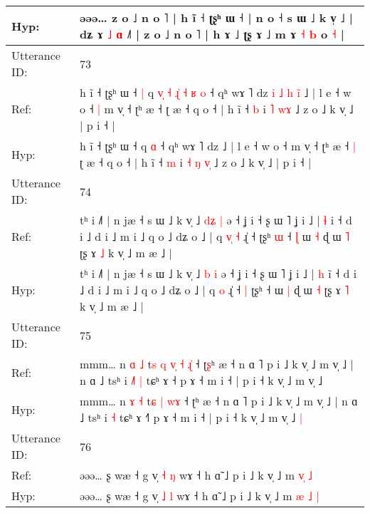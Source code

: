 \documentclass[10pt]{article}
\DeclareRobustCommand{\hl}[1]{{\textcolor{red}{#1}}}
\begin{document}
\begin{longtable}{ll}
 \\
Hyp: & əəə… z o ˩ n o ˥ | h ĩ ˧ ʈʂʰ ɯ ˧ | n o ˧ s ɯ ˩ k v̩ ˩ | dʑ ɤ\hl{ }\hl{˩}\hl{ }\hl{ɑ} ˩˥ | z o ˩ n o ˥ | h ɤ ˩ ʈʂ ɤ ˩ m ɤ \hl{˧} \hl{b} o \hl{}\hl{˧} |
 \\
\midrule
Utterance ID: & 73 \\
Ref: & h ĩ ˧ ʈʂʰ ɯ ˧\hl{ }\hl{|} q\hl{ }\hl{v}\hl{̩}\hl{ }\hl{˧}\hl{ }\hl{ɻ}\hl{̍}\hl{ }\hl{˧}\hl{ }\hl{ʁ} \hl{o} ˧ qʰ wɤ ˥ dz\hl{ }\hl{i}\hl{ }\hl{˩}\hl{ }\hl{h}\hl{ }\hl{i}\hl{̃} ˩ | l e ˧ w o ˧\hl{ }\hl{|} m v̩ ˧ ʈʰ æ ˧\hl{}\hl{} ʈ æ ˧ q o ˧ | h ĩ ˧ \hl{b} i\hl{}\hl{} \hl{˥} \hl{w}\hl{ɤ} ˩ z o ˩ k v̩ ˩ | p i ˧ |
 \\
Hyp: & h ĩ ˧ ʈʂʰ ɯ ˧\hl{}\hl{} q\hl{}\hl{}\hl{}\hl{}\hl{}\hl{}\hl{}\hl{}\hl{}\hl{}\hl{}\hl{} \hl{ɑ} ˧ qʰ wɤ ˥ dz\hl{}\hl{}\hl{}\hl{}\hl{}\hl{}\hl{}\hl{}\hl{} ˩ | l e ˧ w o ˧\hl{}\hl{} m v̩ ˧ ʈʰ æ ˧\hl{ }\hl{|} ʈ æ ˧ q o ˧ | h ĩ ˧ \hl{m} i\hl{ }\hl{˧} \hl{ŋ} \hl{v}\hl{̩} ˩ z o ˩ k v̩ ˩ | p i ˧ |
 \\
\midrule
Utterance ID: & 74 \\
Ref: & tʰ i ˩˥ | n jæ ˧ s ɯ ˩ k v̩ ˩ \hl{d}\hl{ʑ} \hl{|} ə ˧ ʝ i ˧ ʂ ɯ ˥ ʝ i ˩ | \hl{ɬ} i\hl{} ˧ d i ˩ d i ˩ m i ˩ q o ˩ dʑ o ˩ | q\hl{ }\hl{v}\hl{̩} \hl{˧} ɻ̍ ˧\hl{}\hl{} ʈʂʰ\hl{ }\hl{ɯ} ˧\hl{ }\hl{ɭ} ɯ \hl{˧} ɖ ɯ \hl{˥} ʈʂ ɤ \hl{˩} k v̩ ˩ m æ ˩ |
 \\
Hyp: & tʰ i ˩˥ | n jæ ˧ s ɯ ˩ k v̩ ˩ \hl{}\hl{b} \hl{i} ə ˧ ʝ i ˧ ʂ ɯ ˥ ʝ i ˩ | \hl{h} i\hl{̃} ˧ d i ˩ d i ˩ m i ˩ q o ˩ dʑ o ˩ | q\hl{}\hl{}\hl{} \hl{o} ɻ̍ ˧\hl{ }\hl{|} ʈʂʰ\hl{}\hl{} ˧\hl{}\hl{} ɯ \hl{|} ɖ ɯ \hl{˧} ʈʂ ɤ \hl{˥} k v̩ ˩ m æ ˩ |
 \\
\midrule
Utterance ID: & 75 \\
Ref: & mmm… n \hl{ɑ} \hl{˩} t\hl{s}\hl{ }\hl{q}\hl{ }\hl{v}\hl{̩} \hl{˧} \hl{ɻ}\hl{̍} ˧ ʈ\hl{ʂ}ʰ æ ˧ n ɑ ˥ p i ˩ k v̩ ˩ m v̩ ˩ | n ɑ ˩ tsʰ i\hl{ }\hl{˩}\hl{˥} \hl{|} tɕʰ ɤ ˧\hl{} p ɤ ˧ m i ˧ | p i ˧ k v̩ ˩ m v̩ ˩\hl{}\hl{}
 \\
Hyp: & mmm… n \hl{ɤ} \hl{˧} t\hl{}\hl{}\hl{}\hl{}\hl{}\hl{ɕ} \hl{|} \hl{w}\hl{ɤ} ˧ ʈ\hl{}ʰ æ ˧ n ɑ ˥ p i ˩ k v̩ ˩ m v̩ ˩ | n ɑ ˩ tsʰ i\hl{}\hl{}\hl{} \hl{˧} tɕʰ ɤ ˧\hl{˥} p ɤ ˧ m i ˧ | p i ˧ k v̩ ˩ m v̩ ˩\hl{ }\hl{|}
 \\
\midrule
Utterance ID: & 76 \\
Ref: & əəə… ʂ wæ ˧ g v̩ \hl{˧} \hl{ŋ} wɤ ˧ h ɑ̃ ˩ p i ˩ k v̩ ˩ m \hl{}\hl{v}\hl{̩} \hl{˩}
 \\
Hyp: & əəə… ʂ wæ ˧ g v̩ \hl{˩} \hl{l} wɤ ˧ h ɑ̃ ˩ p i ˩ k v̩ ˩ m \hl{æ}\hl{ }\hl{˩} \hl{|}
 \\

\end{longtable}
\end{document}
